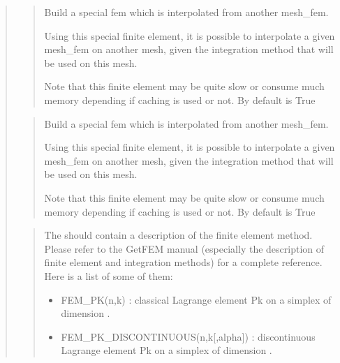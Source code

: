 \documentclass[a4paper,11pt,english]{sphinxmanual}
\begin{document}
\begin{quote}

\begin{quote}

Build a special fem which is interpolated from another mesh\_fem.

Using this special finite element, it is possible to interpolate a given
mesh\_fem  on another mesh, given the integration method 
that will be used on this mesh.

Note that this finite element may be quite slow or consume much
memory depending if caching is used or not. By default  is
True
\end{quote}

\begin{quote}

Build a special fem which is interpolated from another mesh\_fem.

Using this special finite element, it is possible to interpolate a given
mesh\_fem  on another mesh, given the integration method 
that will be used on this mesh.

Note that this finite element may be quite slow or consume much
memory depending if caching is used or not. By default  is
True
\end{quote}

\begin{quote}

The  should contain a description of the finite element
method. Please refer to the GetFEM manual (especially the
description of finite element and integration methods) for a complete
reference. Here is a list of some of them:
\begin{itemize}
\item {} 
FEM\_PK(n,k) :
classical Lagrange element Pk on a simplex of dimension .

\item {} 
FEM\_PK\_DISCONTINUOUS(n,k{[},alpha{]}) :
discontinuous Lagrange element Pk on a simplex of dimension .


\end{itemize}
\end{quote}
\end{quote}
\end{document}
